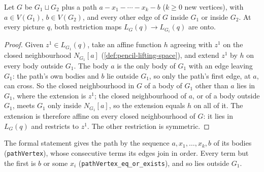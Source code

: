 \begin{lemma}
  \label{lem:pencil-bridge-fibre}
  \leanok
  Let $G$ be $G_1 \sqcup G_2$ plus a path $a - x_1 - \cdots - x_k - b$
  ($k \ge 0$ new vertices), with $a \in V(G_1)$, $b \in V(G_2)$, and
  every other edge of $G$ inside $G_1$ or inside $G_2$. At every
  picture $q$, both restriction maps $L_G(q) \to L_{G_i}(q)$ are onto.
\end{lemma}
\begin{proof}
  \leanok
  Given $z^1 \in L_{G_1}(q)$, take an affine function $h$ agreeing
  with $z^1$ on the closed neighbourhood $N_{G_1}[a]$
  (\cref{def:pencil-lifting-space}), and extend $z^1$ by $h$ on every
  body outside $G_1$. The body $a$ is the only body of $G_1$ with an
  edge leaving $G_1$: the path's own bodies and $b$ lie outside $G_1$,
  so only the path's first edge, at $a$, can cross. So the closed
  neighbourhood in $G$ of a body of $G_1$ other than $a$ lies in $G_1$,
  where the extension is $z^1$; the closed neighbourhood of $a$, or of
  a body outside $G_1$, meets $G_1$ only inside $N_{G_1}[a]$, so the
  extension equals $h$ on all of it. The extension is therefore affine
  on every closed neighbourhood of $G$: it lies in $L_G(q)$ and
  restricts to $z^1$. The other restriction is symmetric.
\end{proof}

\begin{fmlnote}
  The formal statement gives the path by the sequence
  $a, x_1, \dots, x_k, b$ of its bodies (\texttt{pathVertex}), whose
  consecutive terms its edges join in order. Every term but the
  first is $b$ or some $x_i$
  (\texttt{pathVertex\_\allowbreak{}eq\_\allowbreak{}or\_\allowbreak{}exists}),
  and so lies outside $G_1$.
\end{fmlnote}

